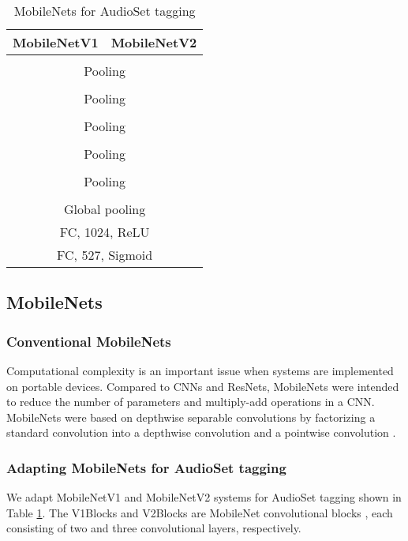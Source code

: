 \documentclass[journal]{IEEEtran}
\begin{document}
\begin{table}
\centering
\caption{MobileNets for AudioSet tagging}
\begin{tabular}{cc} 
\hline
\multicolumn{1}{c|}{MobileNetV1} & \multicolumn{1}{c}{MobileNetV2} \\ 
\hline
\multicolumn{2}{c}{} \\ 
\hline
\multicolumn{2}{c}{Pooling } \\
\hline
\multicolumn{1}{c|}{} & \multicolumn{1}{c}{} \\
\hline
\multicolumn{2}{c}{Pooling } \\
\hline
\multicolumn{1}{c|}{} & \multicolumn{1}{c}{} \\
\hline
\multicolumn{2}{c}{Pooling } \\
\hline
\multicolumn{1}{c|}{} & \multicolumn{1}{c}{} \\
\hline
\multicolumn{2}{c}{Pooling } \\
\hline
\multicolumn{1}{c|}{} & \multicolumn{1}{c}{} \\
\hline
\multicolumn{2}{c}{Pooling } \\
\hline
\multicolumn{1}{c|}{} & \multicolumn{1}{c}{} \\
\hline
\multicolumn{2}{c}{Global pooling} \\
\hline
\multicolumn{2}{c}{FC, 1024, ReLU} \\
\hline
\multicolumn{2}{c}{FC, 527, Sigmoid} \\
\hline
\end{tabular}
\label{table:mobilenet_architecture}
\end{table}

\subsection{MobileNets}\label{section:mobile_net}
\subsubsection{Conventional MobileNets}
Computational complexity is an important issue when systems are implemented on portable devices. Compared to CNNs and ResNets, MobileNets were intended to reduce the number of parameters and multiply-add operations in a CNN. MobileNets were based on depthwise separable convolutions \cite{howard2017mobilenets} by factorizing a standard convolution into a depthwise convolution and a  pointwise convolution \cite{howard2017mobilenets}.

\subsubsection{Adapting MobileNets for AudioSet tagging}
We adapt MobileNetV1 \cite{howard2017mobilenets} and MobileNetV2 \cite{sandler2018mobilenetv2} systems for AudioSet tagging shown in Table \ref{table:mobilenet_architecture}. The V1Blocks and V2Blocks are MobileNet convolutional blocks \cite{howard2017mobilenets}\cite{sandler2018mobilenetv2}, each consisting of two and three convolutional layers, respectively. 
\end{document}

